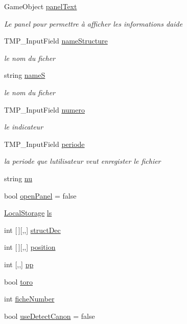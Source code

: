 \begin{DoxyCompactItemize}
Game\+Object \mbox{\hyperlink{class_simulation2_ae3c3d1bfed4939037239dc36e4f48c01}{panel\+Text}}
\begin{DoxyCompactList}\small\item\em Le panel pour permettre à afficher les informations d\textquotesingle{}aide \end{DoxyCompactList}\item 
T\+M\+P\+\_\+\+Input\+Field \mbox{\hyperlink{class_simulation2_a3aa2513e53b3020ee37f02b2cde141b5}{name\+Structure}}
\begin{DoxyCompactList}\small\item\em le nom du ficher \end{DoxyCompactList}\item 
string \mbox{\hyperlink{class_simulation2_aa7e4143d785bbe0d82854ddb143a3585}{nameS}}
\begin{DoxyCompactList}\small\item\em le nom du ficher \end{DoxyCompactList}\item 
T\+M\+P\+\_\+\+Input\+Field \mbox{\hyperlink{class_simulation2_ad12f8511d6f40bb36c7c6a59f54dde8c}{numero}}
\begin{DoxyCompactList}\small\item\em le indicateur \end{DoxyCompactList}\item 
T\+M\+P\+\_\+\+Input\+Field \mbox{\hyperlink{class_simulation2_a65e50727f755df30407afa8b931e10c0}{periode}}
\begin{DoxyCompactList}\small\item\em la periode que l\textquotesingle{}utilisateur veut enregister le fichier \end{DoxyCompactList}\item 
string \mbox{\hyperlink{class_simulation2_aca35383d89ed51e965122457e8808d56}{nu}}
\item 
bool \mbox{\hyperlink{class_simulation2_a72c067338ece18bf0182f9e5e97ebbe0}{open\+Panel}} = false
\item 
\mbox{\hyperlink{class_local_storage}{Local\+Storage}} \mbox{\hyperlink{class_simulation2_ab6caf75542f3e7779466d98dafe3043f}{ls}}
\item 
int \mbox{[}$\,$\mbox{]}\mbox{[},,\mbox{]} \mbox{\hyperlink{class_simulation2_ad4246f77655a4f827a7f22ffa4d95d97}{struct\+Dec}}
\item 
int \mbox{[}$\,$\mbox{]}\mbox{[},,\mbox{]} \mbox{\hyperlink{class_simulation2_ac598aba18865c6b3dccbbd8f7126e134}{position}}
\item 
int \mbox{[},,\mbox{]} \mbox{\hyperlink{class_simulation2_a3ee6c95cd49428c222b8d1370c49bf96}{pp}}
\item 
bool \mbox{\hyperlink{class_simulation2_abefcdee48ca39bb47d28984bcf033ca4}{toro}}
\item 
int \mbox{\hyperlink{class_simulation2_ac73e8ee231cc7ebeabcac9ad3c903810}{fiche\+Number}}
\item 
bool \mbox{\hyperlink{class_simulation2_ae390b35abb2471abc8e257633896404a}{use\+Detect\+Canon}} = false
\end{DoxyCompactItemize}


